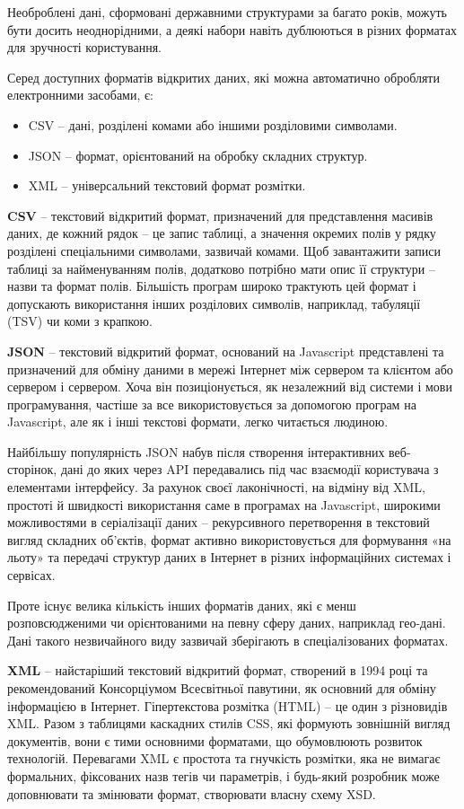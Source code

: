 Необроблені дані, сформовані державними структурами за багато років, можуть бути досить
неоднорідними, а деякі набори навіть дублюються в різних форматах для зручності користування.

Серед доступних форматів відкритих даних, які можна автоматично обробляти
електронними засобами, є:

\begin{itemize}
  \item CSV – дані, розділені комами або іншими розділовими символами.
  \item JSON – формат, орієнтований на обробку складних структур.
  \item XML – універсальний текстовий формат розмітки.
\end{itemize}

\textbf{CSV} – текстовий відкритий формат, призначений для представлення масивів даних, де
кожний рядок – це запис таблиці, а значення окремих полів у рядку розділені спеціальними
символами, зазвичай комами. Щоб завантажити записи таблиці за найменуванням полів, додатково потрібно мати опис її структури –
назви та формат полів.
Більшість програм широко трактують цей формат і допускають використання інших розділових символів,
наприклад, табуляції (TSV) чи коми з крапкою.

\textbf{JSON} – текстовий відкритий формат, оснований на Javascript представлені
та призначений для обміну даними в мережі Інтернет між сервером та
клієнтом або сервером і сервером. Хоча він позиціонується, як незалежний від системи і
мови програмування, частіше за все використовується за допомогою програм на Javascript,
але як і інші текстові формати, легко читається людиною.

Найбільшу популярність JSON набув після створення інтерактивних веб-сторінок, дані до
яких через API передавались під час взаємодії користувача з елементами інтерфейсу.
За рахунок своєї лаконічності, на відміну від XML, простоті й швидкості
використання саме в програмах на Javascript, широкими можливостями в серіалізації даних
– рекурсивного перетворення в текстовий вигляд складних об’єктів,
формат активно використовується для формування «на льоту»
та передачі структур даних в Інтернет в різних
інформаційних системах і сервісах.

Проте існує велика кількість інших форматів даних, які є менш розповсюдженими чи орієнтованими на певну сферу даних,
наприклад гео-дані. Дані такого незвичайного виду зазвичай зберігають в спеціалізованих форматах.

\textbf{XML} – найстаріший текстовий відкритий формат, створений в 1994 році та рекомендований
Консорціумом Всесвітньої павутини, як основний для обміну інформацією в Інтернет.
Гіпертекстова розмітка (HTML) – це один з різновидів XML. Разом з таблицями каскадних
стилів CSS, які формують зовнішній вигляд документів, вони є тими основними форматами,
що обумовлюють розвиток технологій.
Перевагами XML є простота та гнучкість розмітки, яка не вимагає формальних, фіксованих
назв тегів чи параметрів, і будь-який розробник може доповнювати та змінювати формат,
створювати власну схему XSD.

